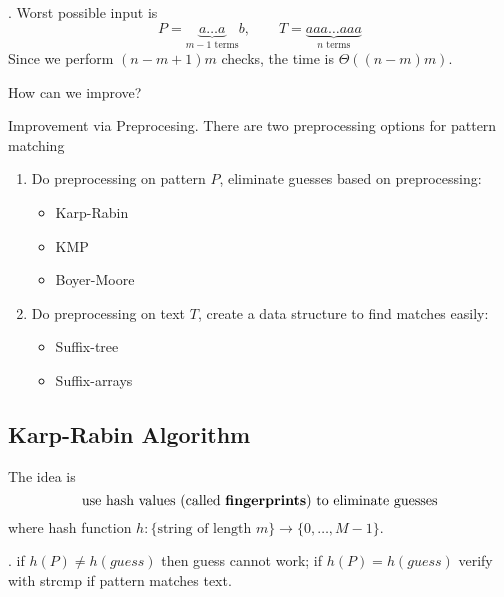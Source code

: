 \documentclass{article}
\begin{document}
\begin{examplee}.
    Worst possible input is 
    \[ P = \underbrace{a \ldots a}_{m - 1 \text{ terms}} b, \qquad T = \underbrace{aaa \ldots aaa}_{n \text{ terms}} \] 
    Since we perform $(n - m + 1)m$ checks, the time is $\Theta( (n - m)m )$.
\end{examplee}

\begin{Question}{}
    How can we improve? 
\end{Question}

\begin{solution}
    Improvement via Preprocesing. There are two preprocessing options for pattern matching \begin{enumerate}
        \item Do preprocessing on pattern $P$, eliminate guesses based on preprocessing: \begin{itemize}
            \item Karp-Rabin \item KMP \item Boyer-Moore 
        \end{itemize}
        \item Do preprocessing on text $T$, create a data structure to find matches easily: \begin{itemize}
            \item Suffix-tree \item Suffix-arrays
        \end{itemize}
    \end{enumerate}
\end{solution}

\subsection{Karp-Rabin Algorithm} 

The idea is 
\[ \text{ use hash values (called \textbf{fingerprints}) to eliminate guesses } \]
where hash function $h : \{ \text{string of length $m$} \} \rightarrow \{0, \ldots, M - 1\}$. 

\begin{comm}[].
    if $h(P) \neq h(guess)$ then guess cannot work; if $h(P) = h(guess)$ verify with strcmp if pattern matches text. 
\end{comm}
\end{document}

